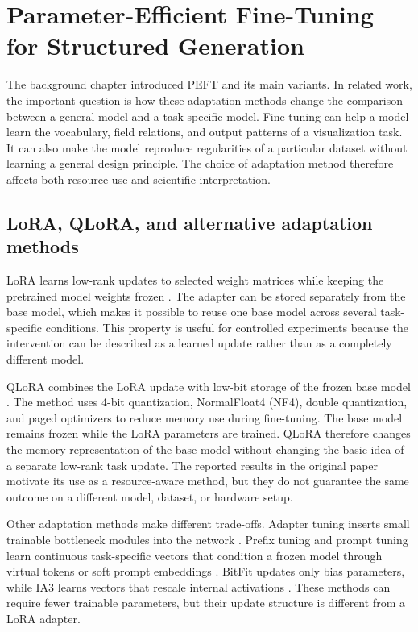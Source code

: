 \section{Parameter-Efficient Fine-Tuning for Structured Generation}

The background chapter introduced PEFT and its main variants. In related work, the important question is how these adaptation methods change the comparison between a general model and a task-specific model. Fine-tuning can help a model learn the vocabulary, field relations, and output patterns of a visualization task. It can also make the model reproduce regularities of a particular dataset without learning a general design principle. The choice of adaptation method therefore affects both resource use and scientific interpretation.

\subsection{LoRA, QLoRA, and alternative adaptation methods}

LoRA learns low-rank updates to selected weight matrices while keeping the pretrained model weights frozen \cite{hu2022lora}. The adapter can be stored separately from the base model, which makes it possible to reuse one base model across several task-specific conditions. This property is useful for controlled experiments because the intervention can be described as a learned update rather than as a completely different model.

QLoRA combines the LoRA update with low-bit storage of the frozen base model \cite{dettmers2023qlora}. The method uses 4-bit quantization, NormalFloat4 (NF4), double quantization, and paged optimizers to reduce memory use during fine-tuning. The base model remains frozen while the LoRA parameters are trained. QLoRA therefore changes the memory representation of the base model without changing the basic idea of a separate low-rank task update. The reported results in the original paper motivate its use as a resource-aware method, but they do not guarantee the same outcome on a different model, dataset, or hardware setup.

Other adaptation methods make different trade-offs. Adapter tuning inserts small trainable bottleneck modules into the network \cite{houlsby2019adapter}. Prefix tuning and prompt tuning learn continuous task-specific vectors that condition a frozen model through virtual tokens or soft prompt embeddings \cite{li2021prefixtuning,lester2021prompttuning}. BitFit updates only bias parameters, while IA3 learns vectors that rescale internal activations \cite{benzaken2022bitfit,liu2022ia3}. These methods can require fewer trainable parameters, but their update structure is different from a LoRA adapter.

